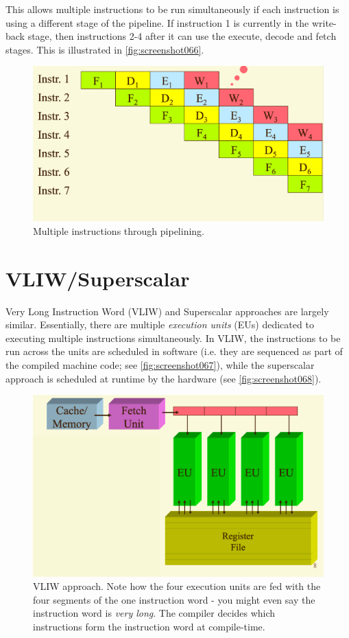 This allows multiple instructions to be run simultaneously if each instruction is using a different stage of the pipeline. If instruction 1 is currently in the write-back stage, then instructions 2-4 after it can use the execute, decode and fetch stages. This is illustrated in \autoref{fig:screenshot066}.

\begin{figure}
\centering
\includegraphics[width=0.7\linewidth]{screenshot066}
\caption{Multiple instructions through pipelining.}
\label{fig:screenshot066}
\end{figure}

\section{VLIW/Superscalar}
Very Long Instruction Word (VLIW) and Superscalar approaches are largely similar. Essentially, there are multiple \textit{execution units} (EUs) dedicated to executing multiple instructions simultaneously. In VLIW, the instructions to be run across the units are scheduled in software (i.e. they are sequenced as part of the compiled machine code; see \autoref{fig:screenshot067}), while the superscalar approach is scheduled at runtime by the hardware (see \autoref{fig:screenshot068}).

\begin{figure}
\centering
\includegraphics[width=0.7\linewidth]{screenshot067}
\caption[VLIW approach.]{VLIW approach. Note how the four execution units are fed with the four segments of the one instruction word - you might even say the instruction word is \textit{very long}. The compiler decides which instructions form the instruction word at compile-time.}
\label{fig:screenshot067}
\end{figure}


